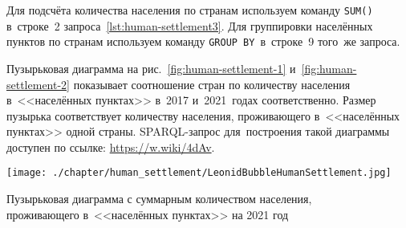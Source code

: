 Для подсчёта количества населения по странам 
используем команду \lstinline|SUM()| в~строке~2 запроса~\ref{lst:human-settlement3}. 
Для группировки населённых пунктов по странам 
используем команду \lstinline|GROUP BY|\, в~строке~9 того~же запроса.

Пузырьковая диаграмма на рис.~\ref{fig:human-settlement-1} и~\ref{fig:human-settlement-2} 
показывает соотношение стран по количеству населения в~<<населённых пунктах>> 
в~2017 и~2021~годах соответственно. 
Размер пузырька соответствует количеству населения, проживающего в~<<населённых пунктах>> одной страны. 
SPARQL-запрос для~построения такой диаграммы доступен по ссылке: \href{https://w.wiki/4dAv}{https://w.wiki/4dAv}.

\begin{marginfigure}[0.0cm]
	\texttt{[image: ./chapter/human\_settlement/LeonidBubbleHumanSettlement.jpg]}
    \caption[Сколько населения проживает в~населённых пунктах, 2021.]{Пузырьковая диаграмма с суммарным количеством населения,\\проживающего в~<<населённых пунктах>> на 2021 год} 
	\label{fig:human-settlement-2}
\end{marginfigure}



